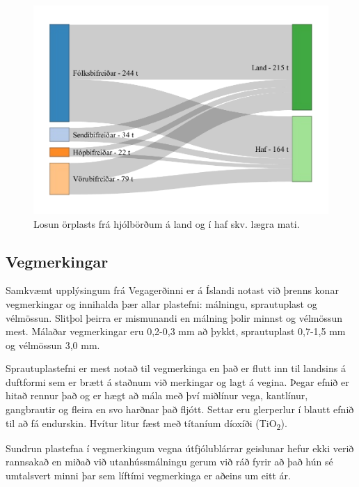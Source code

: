 \documentclass[icelandic,]{book}
\begin{document}
\begin{figure}[H]

{\centering \includegraphics{_bookdown_files/OrplastHaf_files/figure-latex/akstur2-1} 

}

\caption{Losun örplasts frá hjólbörðum á land og í haf skv. lægra mati.}\label{fig:akstur2}
\end{figure}

\hypertarget{vegmerkingar}{%
\subsection*{Vegmerkingar}\label{vegmerkingar}}

Samkvæmt upplýsingum frá Vegagerðinni er á Íslandi notast við þrenns konar vegmerkingar og innihalda þær allar plastefni: málningu, sprautuplast og vélmössun. Slitþol þeirra er mismunandi en málning þolir minnst og vélmössun mest. Málaðar vegmerkingar eru 0,2-0,3 mm að þykkt, sprautuplast 0,7-1,5 mm og vélmössun 3,0 mm.

Sprautuplastefni er mest notað til vegmerkinga en það er flutt inn til landsins á duftformi sem er brætt á staðnum við merkingar og lagt á vegina. Þegar efnið er hitað rennur það og er hægt að mála með því miðlínur vega, kantlínur, gangbrautir og fleira en svo harðnar það fljótt. Settar eru glerperlur í blautt efnið til að fá endurskin. Hvítur litur fæst með títaníum díoxíði (TiO\textsubscript{2}).

Sundrun plastefna í vegmerkingum vegna útfjólublárrar geislunar hefur ekki verið rannsakað en miðað við utanhússmálningu gerum við ráð fyrir að það hún sé umtalsvert minni þar sem líftími vegmerkinga er aðeins um eitt ár.
\end{document}
